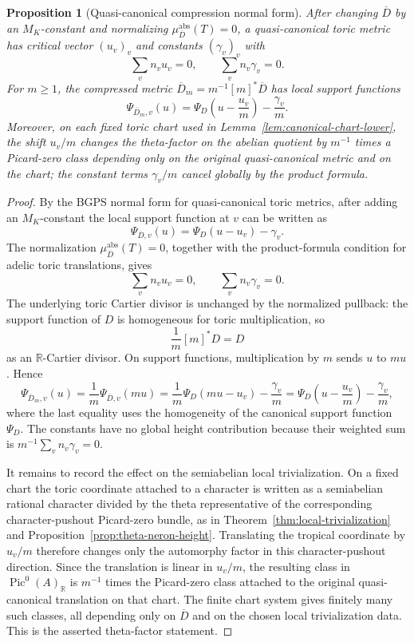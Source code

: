 \documentclass[10pt,a4paper]{amsart}
\theoremstyle{plain}
\newtheorem{proposition}[theorem]{Proposition}
\theoremstyle{plain}
\numberwithin{equation}{section}
\providecommand{\ol}{\overline}
\providecommand{\muabs}{\mu^{\mathrm{abs}}}
\begin{document}
\begin{proposition}[Quasi-canonical compression normal form]
	\label{prop:qcanonical-compression-normal-form}
	\label{input:qcanonical-compression-normal-form}
	After changing \(\ol D\) by an \(M_K\)-constant and normalizing
	\(\muabs_{\ol D}(T)=0\), a quasi-canonical toric metric has critical vector
	\((u_v)_v\) and constants \((\gamma_v)_v\) with
	\[
	\sum_vn_vu_v=0,\qquad \sum_vn_v\gamma_v=0.
	\]
	For \(m\ge1\), the compressed metric
	\(\ol D_m=m^{-1}[m]^*\ol D\) has local support functions
	\[
	\Psi_{\ol D_m,v}(u)
	=
	\Psi_D\left(u-\frac{u_v}{m}\right)-\frac{\gamma_v}{m}.
	\]
	Moreover, on each fixed toric chart used in
	Lemma~\ref{lem:canonical-chart-lower}, the shift \(u_v/m\) changes the
	theta-factor on the abelian quotient by \(m^{-1}\) times a Picard-zero class
	depending only on the original quasi-canonical metric and on the chart; the
	constant terms \(\gamma_v/m\) cancel globally by the product formula.
\end{proposition}

\begin{proof}
	By the BGPS normal form for quasi-canonical toric metrics, after adding an
	\(M_K\)-constant the local support function at \(v\) can be written as
	\[
	\Psi_{\ol D,v}(u)=\Psi_D(u-u_v)-\gamma_v .
	\]
	The normalization \(\muabs_{\ol D}(T)=0\), together with the product-formula
	condition for adelic toric translations, gives
	\[
	\sum_v n_vu_v=0,\qquad \sum_v n_v\gamma_v=0.
	\]
	The underlying toric Cartier divisor is unchanged by the normalized pullback:
	the support function of \(D\) is homogeneous for toric multiplication, so
	\[
	\frac1m[m]^*D=D
	\]
	as an \(\mathbb R\)-Cartier divisor.  On support functions, multiplication by
	\(m\) sends \(u\) to \(mu\).  Hence
	\[
	\Psi_{\ol D_m,v}(u)
	=
	\frac1m\Psi_{\ol D,v}(mu)
	=
	\frac1m\Psi_D(mu-u_v)-\frac{\gamma_v}{m}
	=
	\Psi_D\left(u-\frac{u_v}{m}\right)-\frac{\gamma_v}{m},
	\]
	where the last equality uses the homogeneity of the canonical support function
	\(\Psi_D\).  The constants have no global height contribution because their
	weighted sum is \(m^{-1}\sum_vn_v\gamma_v=0\).
	
	It remains to record the effect on the semiabelian local trivialization.  On a
	fixed chart the toric coordinate attached to a character is written as a
	semiabelian rational character divided by the theta representative of the
	corresponding character-pushout Picard-zero bundle, as in
	Theorem~\ref{thm:local-trivialization} and
	Proposition~\ref{prop:theta-neron-height}.  Translating the tropical coordinate
	by \(u_v/m\) therefore changes only the automorphy factor in this
	character-pushout direction.  Since the translation is linear in \(u_v/m\), the
	resulting class in \(\operatorname{Pic}^0(A)_\mathbb R\) is \(m^{-1}\) times
	the Picard-zero class attached to the original quasi-canonical translation on
	that chart.  The finite chart system gives finitely many such classes, all
	depending only on \(\ol D\) and on the chosen local trivialization data.  This
	is the asserted theta-factor statement.
\end{proof}
\end{document}
